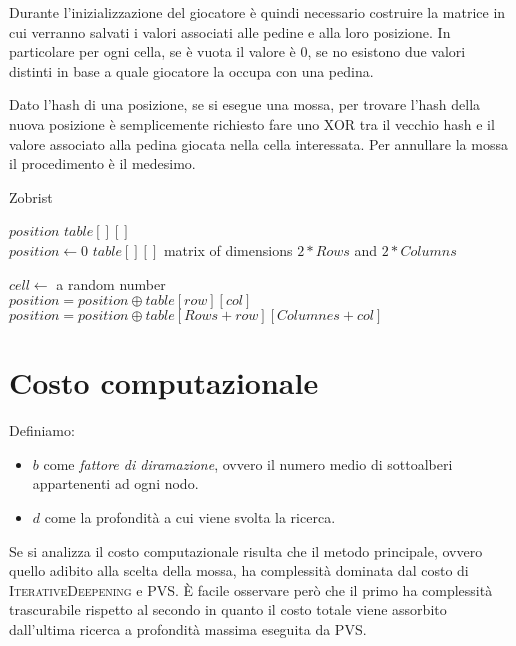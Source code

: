 \documentclass[a4paper]{article}
\begin{document}
Durante l'inizializzazione del giocatore è quindi necessario costruire la 
matrice in cui verranno salvati i valori associati alle pedine e alla loro 
posizione. In particolare per ogni cella, se è vuota il valore è 0, se no 
esistono due valori distinti in base a quale giocatore la occupa con una pedina.

Dato l'hash di una posizione, se si esegue una mossa, per trovare l'hash della
nuova posizione è semplicemente richiesto fare uno XOR tra il vecchio hash e il
valore associato alla pedina giocata nella cella interessata. Per annullare la
mossa il procedimento è il medesimo.

\begin{algorithm}
  \caption{Zobrist}
  \begin{algorithmic}
    \State $position$
    \State $table[][]$
    \\
      \State $position \gets 0$
      \State $table[][]$ matrix of dimensions $2 * Rows$ and $2 * Columns$

      \State $cell \gets $ a random number
      \EndFor
    \EndFunction
    \\
        \State $position = position \oplus table[row][col]$
      \Else
        \State $position = position \oplus table[Rows + row][Columnes + col]$
      \EndIf
    \EndFunction
  \end{algorithmic}
\end{algorithm}

\section{Costo computazionale}
Definiamo:
\begin{itemize}
  \item $b$ come \emph{fattore di diramazione}, ovvero il numero medio di
    sottoalberi appartenenti ad ogni nodo.
  \item $d$ come la profondità a cui viene svolta la ricerca.
\end{itemize}

Se si analizza il costo computazionale risulta che il metodo principale, ovvero 
quello adibito alla scelta della mossa, ha complessità  dominata  dal costo di
\textsc{IterativeDeepening} e \textsc{PVS}. È facile osservare però che il primo 
ha complessità trascurabile rispetto al secondo in quanto il costo totale viene
assorbito dall'ultima ricerca a profondità massima eseguita da PVS. 
\end{document}

